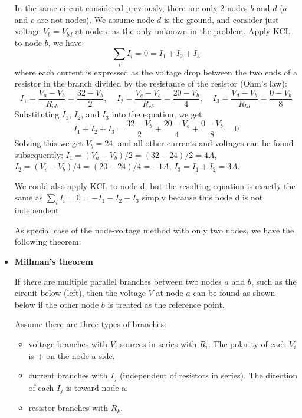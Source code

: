 \documentclass{article}
\begin{document}
\begin{itemize}

  In the same circuit considered previously, there are only 2 nodes $b$ 
  and $d$ ($a$ and $c$ are not nodes). We assume node $d$ is the ground,
  and consider just voltage $V_b=V_{bd}$ at node $v$ as the only unknown in 
  the problem. Apply KCL to node $b$, we have
  \begin{equation}
    \sum_i I_i=0=I_1+I_2+I_3	
  \end{equation}
  where each current is expressed as the voltage drop between the two
  ends of a resistor in the branch divided by the resistance of the
  resistor (Ohm's law):
  \begin{equation}
    I_1=\frac{V_a-V_b}{R_{ab}}=\frac{32-V_b}{2},\;\;\;\;
    I_2=\frac{V_c-V_b}{R_{cb}}=\frac{20-V_b}{4},\;\;\;\;
    I_3=\frac{V_d-V_b}{R_{bd}}=\frac{0-V_b}{8}  
  \end{equation}
  Substituting $I_1$, $I_2$, and $I_3$ into the equation, we get 
  \begin{equation}
    I_1+I_2+I_3=\frac{32-V_b}{2}+\frac{20-V_b}{4}+\frac{0-V_b}{8}=0
  \end{equation}
  Solving this we get $V_b=24$, and all other currents and voltages can 
  be found subsequently: $I_1=(V_a-V_b)/2=(32-24)/2=4A$, 
  $I_2=(V_c-V_b)/4=(20-24)/4=-1A$, $I_3=I_1+I_2=3A$.

  We could also apply KCL to node d, but the resulting equation is exactly
  the same as $\sum_i I_i=0=-I_1-I_2-I_3$ simply because this node d is not 
  independent.

  As special case of the node-voltage method with only two nodes, we have the
  following theorem:


\item {\bf Millman's theorem} 

  If there are multiple parallel branches between two nodes $a$ and $b$, 
  such as the circuit below (left), then the voltage $V$ at node $a$ can 
  be found as shown below if the other node $b$ is treated as the reference 
  point.

  Assume there are three types of branches:
  \begin{itemize}
  \item voltage branches with $V_i$ sources in series with $R_i$. The
    polarity of each $V_i$ is + on the node a side.
  \item current branches with $I_j$ (independent of resistors in series).
    The direction of each $I_j$ is toward node a.
  \item resistor branches with $R_k$.
  \end{itemize}


\end{itemize}
\end{document}
